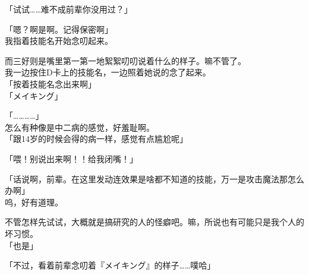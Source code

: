 「试试……难不成前辈你没用过？」

「嗯？啊是啊。记得保密啊」\\

我指着技能名开始念叨起来。

而三好则是嘴里第一第一地絮絮叨叨说着什么的样子。嘛不管了。\\

我一边按住D卡上的技能名，一边照着她说的念了起来。\\

「按着技能名念出来啊」\\

「メイキング」

「…………」\\

怎么有种像是中二病的感觉，好羞耻啊。\\

「跟14岁的时候会得的病一样，感觉有点尴尬呢」

「喂！别说出来啊！！给我闭嘴！」

「话说啊，前辈。在这里发动连效果是啥都不知道的技能，万一是攻击魔法那怎么办啊」\\

呜，好有道理。

不管怎样先试试，大概就是搞研究的人的怪癖吧。嘛，所说也有可能只是我个人的坏习惯。\\

「也是」

「不过，看着前辈念叨着『メイキング』的样子……噗哈」

